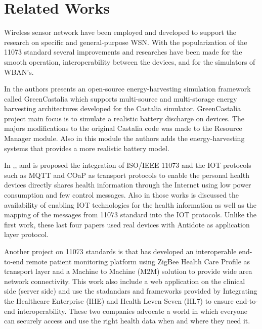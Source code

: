 \section{Related Works}\label{relatedworks}

Wireless sensor network have been employed and developed to support the research on specific and general-purpose WSN. 
With the popularization of the 11073 standard several improvements and researches have been made for the smooth operation, interoperability between the devices, and for the simulators of WBAN's.

In \cite{b6} the authors presents an open-source energy-harvesting simulation framework called GreenCastalia which supports multi-source and multi-storage energy harvesting architectures developed for the Castalia simulator. GreenCastalia project main focus is to simulate a realistic battery discharge on devices. The majors modifications to the original Castalia code was made to the Resource Manager module. Also in this module the authors adds the energy-harvesting systems that provides a more realistic battery model.

In \cite{b7},\cite{b8},\cite{b9} and \cite{b10} is proposed the integration of ISO/IEEE 11073 and the IOT protocols such as MQTT and COaP as transport protocols to enable the personal health devices directly shares health information through the Internet using low power consumption and few control messages. Also in those works is discussed the availability of enabling IOT technologies for the health information as well as the mapping of the messages from 11073 standard into the IOT protocols. Unlike the first work, these last four papers used real devices with Antidote as application layer protocol.

Another project on 11073 standards is \cite{b11} that has developed an interoperable  end-to-end remote patient monitoring platform using ZigBee Health Care Profile as transport layer and a Machine to Machine (M2M) solution to provide wide area network connectivity. This work also include a web application on the clinical side (server side) and use the stadandars and frameworks provided by Integrating the Healthcare Enterprise (IHE) \cite{b13} and Health Leven Seven (HL7) \cite{b12} to ensure end-to-end interoperability. These two companies advocate a world in which everyone can securely access and use the right health data when and where they need it.

